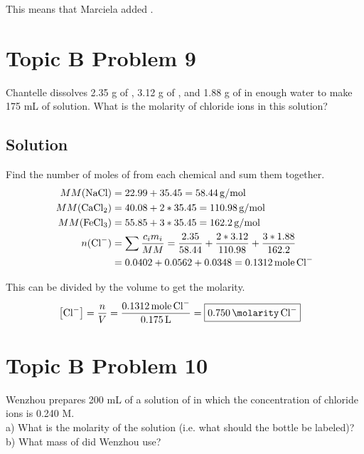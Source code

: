 \documentclass[10pt]{article}
\begin{document}
            This means that Marciela added .

    \pagebreak
    \section{Topic B Problem 9}
        Chantelle dissolves 2.35 g of , 3.12 g of , and 1.88 g of  in enough water to make 175 mL of solution. 
        What is the molarity of chloride ions in this solution?

        \subsection{Solution}
            Find the number of moles of  from each chemical and sum them together.
            \begin{align}
                MM(\ce{NaCl})   &=  22.99 + 35.45   =   58.44\,\unit{\gram/\mole}
                \\
                MM(\ce{CaCl2})  &=  40.08 + 2 * 35.45   =   110.98\,\unit{\gram/\mole}
                \\
                MM(\ce{FeCl3})  &=  55.85 + 3 * 35.45   =   162.2\,\unit{\gram/\mole}
                \\
                n(\ce{Cl-}) &=  \sum \frac{c_i m_i}{MM}
                    =   \frac{2.35}{58.44} + \frac{2 * 3.12}{110.98} + \frac{3 * 1.88}{162.2}\\
                    &=  0.0402 + 0.0562 + 0.0348
                    =   0.1312\,\unit{mole}\,\ce{Cl-}
            \end{align}

            This can be divided by the volume to get the molarity.
            \begin{align}
                \left[ \ce{Cl-} \right] &=  \frac{n}{V}
                    =   \frac{0.1312\,\unit{mole}\,\ce{Cl-}}{0.175\,\unit{\liter}}
                    =   \boxed{0.750\,\unit{\molarity}\,\ce{Cl-}}
            \end{align}

    \pagebreak
    \section{Topic B Problem 10}
        Wenzhou prepares 200 mL of a solution of  in which the concentration of chloride ions is 0.240 M.\\
        a) What is the molarity of the  solution (i.e. what should the bottle be labeled)?\\
        b) What mass of  did Wenzhou use?
\end{document}
